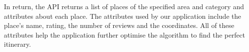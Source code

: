 

In return, the API returns a list of places of the specified area and category
and attributes about each place. The attributes used by our application include
the place's name, rating, the number of reviews and the coordinates. All of
these attributes help the application further optimise the algorithm to find
the perfect itinerary. 






